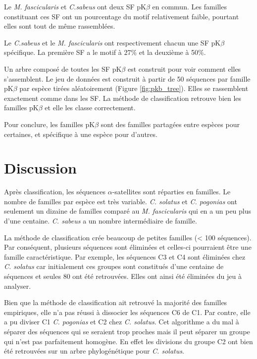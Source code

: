 \documentclass[12pt,a4paper]{article}
\begin{document}
	Le \textit{M. fascicularis} et \textit{C.sabeus} ont deux SF pK$\beta$ en commun. Les familles constituant ces SF ont un pourcentage du motif relativement faible, pourtant elles sont tout de même rassemblées. 
	
	Le \textit{C.sabeus} et le \textit{M. fascicularis} ont respectivement chacun une SF pK$\beta$ spécifique. La première SF a le motif à 27\% et la deuxième à 50\%.
		
	Un arbre composé de toutes les SF pK$\beta$ est construit pour voir comment elles s'assemblent. Le jeu de données est construit à partir de 50 séquences par famille pK$\beta$ par espèce tirées aléatoirement (Figure \ref{fig:pkb_tree}). Elles se rassemblent exactement comme dans les SF. La méthode de classification retrouve bien les familles pK$\beta$ et elle les classe correctement.
	
	Pour conclure, les familles pK$\beta$ sont des familles partagées entre espèces pour certaines, et spécifique à une espèce pour d'autres.

\section{Discussion}

	Après classification, les séquences $\alpha$-satellites sont réparties en familles. Le nombre de familles par espèce est très variable. \textit{C. solatus} et \textit{C. pogonias} ont seulement un dizaine de familles comparé au \textit{M. fascicularis} qui en a un peu plus d'une centaine. \textit{C. sabeus} a un nombre intermédiaire de famille.
	
	La méthode de classification crée beaucoup de petites familles (< 100 séquences). Par conséquent, plusieurs séquences sont éliminées et celles-ci pourraient être  une famille caractéristique. Par exemple, les séquences C3 et C4 sont éliminées chez \textit{C. solatus} car initialement ces groupes sont constitués d'une centaine de séquences et seules  80 ont été retrouvées. Elles ont ainsi été éliminées du jeu à analyser. 
	
	Bien que la méthode de classification ait retrouvé la majorité des familles empiriques, elle n'a pas réussi à dissocier les séquences C6 de C1. Par contre, elle a pu diviser C1 \textit{C. pogonias} et C2  chez \textit{C. solatus}. Cet algorithme a du mal à séparer des séquences qui se seraient trop proches mais il peut séparer un groupe qui n'est pas parfaitement homogène. En effet les divisions du groupe C2 ont bien été retrouvées sur un arbre phylogénétique pour \textit{C. solatus}.
	
\end{document}
